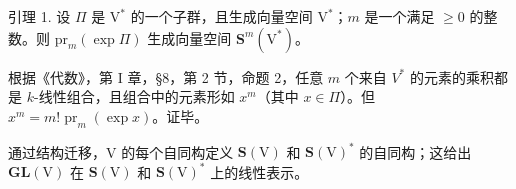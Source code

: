 引理 1. 设 \(\Pi\) 是 \(\mathrm{V}^*\) 的一个子群，且生成向量空间 \(\mathrm{V}^*\)；\(m\) 是一个满足 \(\geq 0\) 的整数。则 \(\mathrm{pr}_m(\exp \Pi)\) 生成向量空间 \(\mathbf{S}^m (\mathrm{V}^*)\)。

根据《代数》，第 I 章，§8，第 2 节，命题 2，任意 \(m\) 个来自 \(V^{*}\) 的元素的乘积都是 \(k\)-线性组合，且组合中的元素形如 \(x^{m}\)（其中 \(x \in \Pi\)）。但 \(x^{m} = m! \operatorname{pr}_{m}(\exp x)\)。证毕。

通过结构迁移，V 的每个自同构定义 \(\mathbf{S}(\mathrm{V})\) 和 \(\mathbf{S}(\mathrm{V})^{*}\) 的自同构；这给出 \(\mathbf{GL}(\mathrm{V})\) 在 \(\mathbf{S}(\mathrm{V})\) 和 \(\mathbf{S}(\mathrm{V})^{*}\) 上的线性表示。

